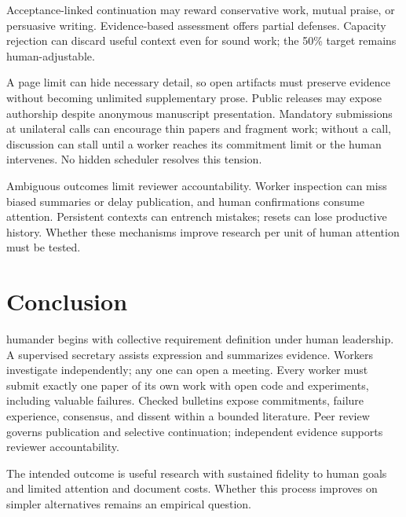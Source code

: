 \documentclass[11pt]{article}
\begin{document}
Acceptance-linked continuation may reward conservative work, mutual praise, or persuasive writing. Evidence-based assessment offers partial defenses. Capacity rejection can discard useful context even for sound work; the 50\% target remains human-adjustable.

A page limit can hide necessary detail, so open artifacts must preserve evidence without becoming unlimited supplementary prose. Public releases may expose authorship despite anonymous manuscript presentation. Mandatory submissions at unilateral calls can encourage thin papers and fragment work; without a call, discussion can stall until a worker reaches its commitment limit or the human intervenes. No hidden scheduler resolves this tension.

Ambiguous outcomes limit reviewer accountability. Worker inspection can miss biased summaries or delay publication, and human confirmations consume attention. Persistent contexts can entrench mistakes; resets can lose productive history. Whether these mechanisms improve research per unit of human attention must be tested.

\section{Conclusion}

humander begins with collective requirement definition under human leadership. A supervised secretary assists expression and summarizes evidence. Workers investigate independently; any one can open a meeting. Every worker must submit exactly one paper of its own work with open code and experiments, including valuable failures. Checked bulletins expose commitments, failure experience, consensus, and dissent within a bounded literature. Peer review governs publication and selective continuation; independent evidence supports reviewer accountability.

The intended outcome is useful research with sustained fidelity to human goals and limited attention and document costs. Whether this process improves on simpler alternatives remains an empirical question.
\end{document}
